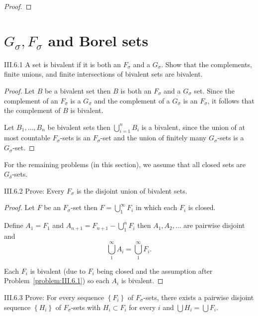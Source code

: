 \begin{proof}
\end{proof}

\section{\( G_{\sigma}, F_{\sigma} \) and Borel sets}

\begin{problem}{III.6.1}\label{problem:III.6.1}
A set is bivalent if it is both an \(F_{\sigma}\) and a \(G_{\sigma}\). Show that the complements, finite unions, and finite intersections of bivalent sets are bivalent.
\end{problem}

\begin{proof}
    Let \(B\) be a bivalent set then \(B\) is both an \(F_{\sigma}\) and a \(G_{\sigma}\) set. Since the complement of an \(F_{\sigma}\) is a \(G_{\sigma}\) and the complement of a \(G_{\sigma}\) is an \(F_{\sigma}\), it follows that the complement of \(B\) is bivalent.

    Let \( B_{1}, \ldots, B_{n} \) be bivalent sets then \( \bigcup^{n}_{i=1}B_{i} \) is a bivalent, since the union of at most countable \(F_{\sigma}\)-sets is an \(F_{\sigma}\)-set and the union of finitely many \(G_{\sigma}\)-sets is a \(G_{\sigma}\)-set.
\end{proof}

For the remaining problems (in this section), we assume that all closed sets are \(G_{\delta}\)-sets.

\begin{problem}{III.6.2}\label{problem:III.6.2}
Prove: Every \(F_{\sigma}\) is the disjoint union of bivalent sets.
\end{problem}

\begin{proof}
    Let \(F\) be an \(F_{\sigma}\)-set then \( F = \bigcup^{\infty}_{1} F_{i} \) in which each \(F_{i}\) is closed.

    Define \(A_{1} = F_{1}\) and \(A_{n+1} = F_{n+1} - \bigcup^{n}_{1} F_{i}\) then \( A_{1}, A_{2}, \ldots \) are pairwise disjoint and
    \[
        \bigcup^{\infty}_{1} A_{i} = \bigcup^{\infty}_{1} F_{i}.
    \]

    Each \(F_{i}\) is bivalent (due to \(F_{i}\) being closed and the assumption after Problem~\ref{problem:III.6.1}) so each \(A_{i}\) is bivalent.
\end{proof}

\begin{problem}{III.6.3}\label{problem:III.6.3}
Prove: For every sequence \( \left\{ F_{i} \right\} \) of \(F_{\sigma}\)-sets, there exists a pairwise disjoint sequence \( \left\{ H_{i} \right\} \) of \(F_{\sigma}\)-sets with \(H_{i} \subset F_{i}\) for every \(i\) and \( \bigcup H_{i} = \bigcup F_{i} \).
\end{problem}

